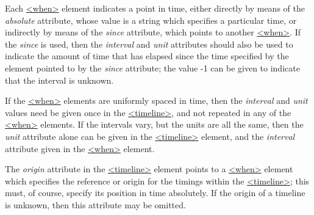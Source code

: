 \par
Each \hyperref[TEI.when]{<when>} element indicates a point in time, either directly by means of the {\itshape absolute} attribute, whose value is a string which specifies a particular time, or indirectly by means of the {\itshape since} attribute, which points to another \hyperref[TEI.when]{<when>}. If the {\itshape since} is used, then the {\itshape interval} and {\itshape unit} attributes should also be used to indicate the amount of time that has elapsed since the time specified by the element pointed to by the {\itshape since} attribute; the value -1 can be given to indicate that the interval is unknown.\par
If the \hyperref[TEI.when]{<when>} elements are uniformly spaced in time, then the {\itshape interval} and {\itshape unit} values need be given once in the \hyperref[TEI.timeline]{<timeline>}, and not repeated in any of the \hyperref[TEI.when]{<when>} elements. If the intervals vary, but the units are all the same, then the {\itshape unit} attribute alone can be given in the \hyperref[TEI.timeline]{<timeline>} element, and the {\itshape interval} attribute given in the \hyperref[TEI.when]{<when>} element.\par
The {\itshape origin} attribute in the \hyperref[TEI.timeline]{<timeline>} element points to a \hyperref[TEI.when]{<when>} element which specifies the reference or origin for the timings within the \hyperref[TEI.timeline]{<timeline>}; this must, of course, specify its position in time absolutely. If the origin of a timeline is unknown, then this attribute may be omitted.\par
